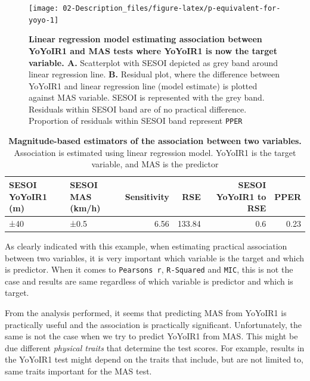 \documentclass[
]{book}
\begin{document}
\begin{figure}

{\centering \texttt{[image: 02-Description\_files/figure-latex/p-equivalent-for-yoyo-1]} 

}

\caption{\textbf{Linear regression model estimating association between YoYoIR1 and MAS tests where YoYoIR1 is now the target variable. A.} Scatterplot with SESOI depicted as grey band around linear regression line. \textbf{B.} Residual plot, where the difference between YoYoIR1 and linear regression line (model estimate) is plotted against MAS variable. SESOI is represented with the grey band. Residuals within SESOI band are of no practical difference. Proportion of residuals within SESOI band represent \texttt{PPER}}\label{fig:p-equivalent-for-yoyo}
\end{figure}





\begin{table}

\caption{\label{tab:association-magnitude-yoyo-table}\textbf{Magnitude-based estimators of the association between two variables.} Association is estimated using linear regression model. YoYoIR1 is the target variable, and MAS is the predictor}
\centering
\begin{tabular}[t]{llrrrr}
\toprule
SESOI YoYoIR1 (m) & SESOI MAS (km/h) & Sensitivity & RSE & SESOI YoYoIR1 to RSE & PPER\\
\midrule
±40 & ±0.5 & 6.56 & 133.84 & 0.6 & 0.23\\
\bottomrule
\end{tabular}
\end{table}

As clearly indicated with this example, when estimating practical association between two variables, it is very important which variable is the target and which is predictor. When it comes to \texttt{Pearson\textquotesingle{}s\ r}, \texttt{R-Squared} and \texttt{MIC}, this is not the case and results are same regardless of which variable is predictor and which is target.

From the analysis performed, it seems that predicting MAS from YoYoIR1 is practically useful and the association is practically significant. Unfortunately, the same is not the case when we try to predict YoYoIR1 from MAS. This might be due different \emph{physical traits} that determine the test scores. For example, results in the YoYoIR1 test might depend on the traits that include, but are not limited to, same traits important for the MAS test.
\end{document}
